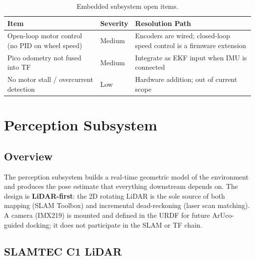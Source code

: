 \documentclass[12pt,a4paper]{report}
\begin{document}
\begin{table}[H]
\centering
\caption{Embedded subsystem open items.}
\label{tab:pico_limits}
\begin{tabularx}{\textwidth}{|p{4.2cm}|p{1.4cm}|X|}
\hline
\textbf{Item} & \textbf{Severity} & \textbf{Resolution Path} \\
\hline
Open-loop motor control (no PID on wheel speed) & Medium & Encoders are wired; closed-loop speed control is a firmware extension \\
\hline
Pico odometry not fused into TF & Medium & Integrate as EKF input when IMU is connected \\
\hline
No motor stall / overcurrent detection & Low & Hardware addition; out of current scope \\
\hline
\end{tabularx}
\end{table}

\chapter{Perception Subsystem}
\label{ch:perception}

\section{Overview}

The perception subsystem builds a real-time geometric model of the environment
and produces the pose estimate that everything downstream depends on. The design
is \textbf{LiDAR-first}: the 2D rotating LiDAR is the sole source of both mapping
(SLAM Toolbox) and incremental dead-reckoning (laser scan matching). A camera
(IMX219) is mounted and defined in the URDF for future ArUco-guided docking; it
does not participate in the SLAM or TF chain.

\section{SLAMTEC C1 LiDAR}
\end{document}
